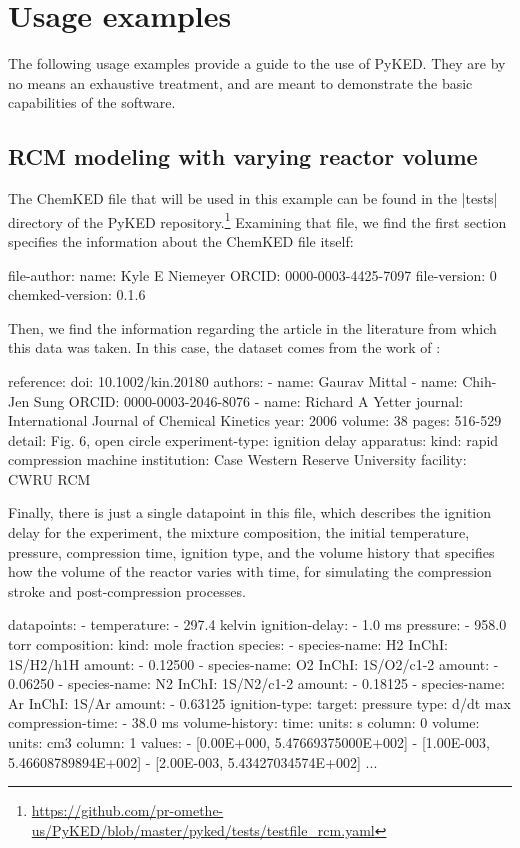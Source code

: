 \documentclass[12pt]{ijck}
\newcommand\ck{ChemKED}
\newcommand\pk{PyKED}
\begin{document}
\section{Usage examples}\label{sec:usage-example}

The following usage examples provide a guide to the use of \pk{}. They are by no
means an exhaustive treatment, and are meant to demonstrate the basic
capabilities of the software.

\subsection{RCM modeling with varying reactor volume}\label{sec:rcm-modeling}

The \ck{} file that will be used in this example can be found in the
\pybox|tests| directory of the PyKED
repository.\footnote{\url{https://github.com/pr-omethe-us/PyKED/blob/master/pyked/tests/testfile_rcm.yaml}}
Examining that file, we find the first section specifies the information about
the \ck{} file itself:
%
\begin{yamlbox}
file-author:
  name: Kyle E Niemeyer
  ORCID: 0000-0003-4425-7097
file-version: 0
chemked-version: 0.1.6
\end{yamlbox}
%
Then, we find the information regarding the article in the literature from which
this data was taken. In this case, the dataset comes from the work of
\textcite{Mittal2006a}:
%
\begin{yamlbox}
reference:
  doi: 10.1002/kin.20180
  authors:
    - name: Gaurav Mittal
    - name: Chih-Jen Sung
      ORCID: 0000-0003-2046-8076
    - name: Richard A Yetter
  journal: International Journal of Chemical Kinetics
  year: 2006
  volume: 38
  pages: 516-529
  detail: Fig. 6, open circle
experiment-type: ignition delay
apparatus:
  kind: rapid compression machine
  institution: Case Western Reserve University
  facility: CWRU RCM
\end{yamlbox}
%
Finally, there is just a single datapoint in this file, which describes the ignition
delay for the experiment, the mixture composition, the initial temperature,
pressure, compression time, ignition type, and the volume history that specifies
how the volume of the reactor varies with time, for simulating the compression
stroke and post-compression processes.
%
\begin{yamlbox}
datapoints:
- temperature:
    - 297.4 kelvin
  ignition-delay:
    - 1.0 ms
  pressure:
    - 958.0 torr
  composition:
    kind: mole fraction
    species:
      - species-name: H2
        InChI: 1S/H2/h1H
        amount:
          - 0.12500
      - species-name: O2
        InChI: 1S/O2/c1-2
        amount:
          - 0.06250
      - species-name: N2
        InChI: 1S/N2/c1-2
        amount:
          - 0.18125
      - species-name: Ar
        InChI: 1S/Ar
        amount:
          - 0.63125
  ignition-type:
    target: pressure
    type: d/dt max
  compression-time:
    - 38.0 ms
  volume-history:
    time:
      units: s
      column: 0
    volume:
      units: cm3
      column: 1
    values:
      - [0.00E+000, 5.47669375000E+002]
      - [1.00E-003, 5.46608789894E+002]
      - [2.00E-003, 5.43427034574E+002]
      ...
\end{yamlbox}
\end{document}
